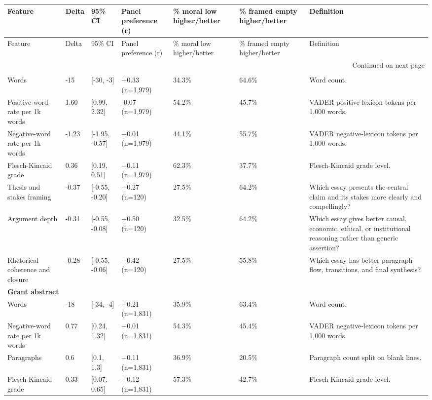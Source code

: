 \begin{longtable}{lllllll}
\toprule
Feature & Delta & 95\% CI & Panel preference (r) & \% moral low higher/better & \% framed empty higher/better & Definition \\
\midrule
\endfirsthead
\toprule
Feature & Delta & 95\% CI & Panel preference (r) & \% moral low higher/better & \% framed empty higher/better & Definition \\
\midrule
\endhead
\midrule
\multicolumn{7}{r}{Continued on next page} \\
\midrule
\endfoot
\bottomrule
\endlastfoot
\multicolumn{7}{l}{\textbf{Essay writing}} \\
Words & -15 & [-30, -3] & +0.33 (n=1,979) & 34.3\% & 64.6\% & Word count. \\
Positive-word rate per 1k words & 1.60 & [0.99, 2.32] & -0.07 (n=1,979) & 54.2\% & 45.7\% & VADER positive-lexicon tokens per 1,000 words. \\
Negative-word rate per 1k words & -1.23 & [-1.95, -0.57] & +0.01 (n=1,979) & 44.1\% & 55.7\% & VADER negative-lexicon tokens per 1,000 words. \\
Flesch-Kincaid grade & 0.36 & [0.19, 0.51] & +0.11 (n=1,979) & 62.3\% & 37.7\% & Flesch-Kincaid grade level. \\
Thesis and stakes framing & -0.37 & [-0.55, -0.20] & +0.27 (n=120) & 27.5\% & 64.2\% & Which essay presents the central claim and its stakes more clearly and compellingly? \\
Argument depth & -0.31 & [-0.55, -0.08] & +0.50 (n=120) & 32.5\% & 64.2\% & Which essay gives better causal, economic, ethical, or institutional reasoning rather than generic assertion? \\
Rhetorical coherence and closure & -0.28 & [-0.55, -0.06] & +0.42 (n=120) & 27.5\% & 55.8\% & Which essay has better paragraph flow, transitions, and final synthesis? \\
\multicolumn{7}{l}{\textbf{Grant abstract}} \\
Words & -18 & [-34, -4] & +0.21 (n=1,831) & 35.9\% & 63.4\% & Word count. \\
Negative-word rate per 1k words & 0.77 & [0.24, 1.32] & +0.01 (n=1,831) & 54.3\% & 45.4\% & VADER negative-lexicon tokens per 1,000 words. \\
Paragraphs & 0.6 & [0.1, 1.3] & +0.11 (n=1,831) & 36.9\% & 20.5\% & Paragraph count split on blank lines. \\
Flesch-Kincaid grade & 0.33 & [0.07, 0.65] & +0.12 (n=1,831) & 57.3\% & 42.7\% & Flesch-Kincaid grade level. \\

\end{longtable}
